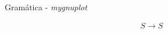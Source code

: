 \documentclass[a4paper,12pt, notitlepage, fleqn]{article}
\newcommand{\va}{\longrightarrow}
\begin{document}
\pagestyle{empty}
\thispagestyle{empty}

\begin{center}
\Large{Gramática - \textit{mygnuplot}}

\begin{gather*}
S \va S
\end{gather*}

\end{center}
\end{document}
